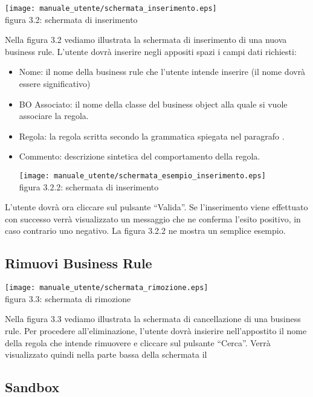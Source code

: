 \begin{center}
\texttt{[image: manuale\_utente/schermata\_inserimento.eps]}\\
 figura 3.2: schermata di inserimento
\end{center}

Nella figura 3.2 vediamo illustrata la schermata di inserimento di una nuova business rule. L'utente dovr\`a inserire negli appositi spazi i campi dati richiesti:
\begin{itemize}
\item Nome: il nome della business rule che l'utente intende inserire (il nome dovr\`a essere significativo)
\item BO Associato: il nome della classe del business object alla quale si vuole associare la regola.
\item Regola: la regola scritta secondo la grammatica spiegata nel paragrafo \Grammatica.
\item Commento: descrizione sintetica del comportamento della regola. 

\begin{center}
\texttt{[image: manuale\_utente/schermata\_esempio\_inserimento.eps]}\\
 figura 3.2.2: schermata di inserimento
\end{center}

\end{itemize}
L'utente dovr\`a ora cliccare sul pulsante ``Valida''. Se l'inserimento viene effettuato con successo verr\`a visualizzato un messaggio che ne conferma l'esito positivo, in caso contrario uno negativo. La figura 3.2.2 ne mostra un semplice esempio. 
\subsection{Rimuovi Business Rule}

\begin{center}
\texttt{[image: manuale\_utente/schermata\_rimozione.eps]}\\
 figura 3.3: schermata di rimozione
\end{center}

Nella figura 3.3 vediamo illustrata la schermata di cancellazione di una business rule. Per procedere all'eliminazione, l'utente dovr\`a insierire nell'appostito  il nome della regola che intende rimuovere e cliccare sul pulsante ``Cerca''. Verr\`a visualizzato quindi nella parte bassa della schermata il 
\subsection{Sandbox}

